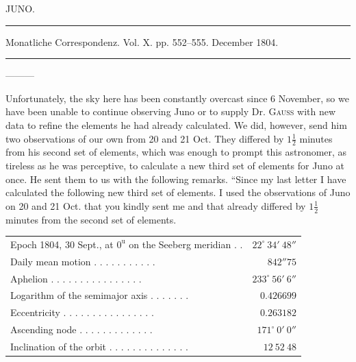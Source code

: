 \clearpage
{}
\hypertarget{native-263-lower}{}
\begin{center}
JUNO.

\rule{0.6\linewidth}{0.4pt}

Monatliche Correspondenz. Vol. X. pp. 552–555. December 1804.

\rule{0.6\linewidth}{0.4pt}
\end{center}

\noindent—\quad—\quad—\par

Unfortunately, the sky here has been constantly overcast since 6 November, so we have been unable to continue observing Juno or to supply Dr. \textsc{Gauss} with new data to refine the elements he had already calculated. We did, however, send him two observations of our own from 20 and 21 Oct. They differed by $1\frac{1}{2}$ minutes from his second set of elements, which was enough to prompt this astronomer, as tireless as he was perceptive, to calculate a new third set of elements for Juno at once. He sent them to us with the following remarks. “Since my last letter I have calculated the following new third set of elements. I used the observations of Juno on 20 and 21 Oct. that you kindly sent me and that already differed by $1\frac{1}{2}$ minutes from the second set of elements.

\begin{center}
\begingroup\fontsize{8}{10}\selectfont\setlength{\tabcolsep}{3pt}\renewcommand{\arraystretch}{1.1}
\begin{tabular}{lr}
Epoch 1804, 30 Sept., at $0^{\mathrm u}$ on the Seeberg meridian . . & $22^\circ\ 34'\ 48''$ \\
Daily mean motion . . . . . . . . . . . & $842''75$ \\
Aphelion . . . . . . . . . . . . . . . . & $233^\circ\ 56'\ 6''$ \\
Logarithm of the semimajor axis . . . . . . . & $0.426699$ \\
Eccentricity . . . . . . . . . . . . . . . . & $0.263182$ \\
Ascending node . . . . . . . . . . . . . & $171^\circ\ 0'\ 0''$ \\
Inclination of the orbit . . . . . . . . . . . . . . & $12\ 52\ 48$ \\
\end{tabular}\endgroup
\end{center}

